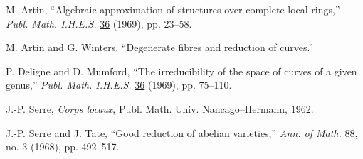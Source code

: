 \begin{enumerate}[label={[\arabic*]},leftmargin=3em]
\item M. Artin, ``Algebraic approximation of structures over complete
local rings,'' \emph{Publ. Math. I.H.E.S.} \underline{36} (1969),
pp. 23--58.

\item M. Artin and G. Winters, ``Degenerate fibres and reduction of
curves.''

\item P. Deligne and D. Mumford, ``The irreducibility of the space of
curves of a given genus,'' \emph{Publ. Math. I.H.E.S.} \underline{36}
(1969), pp. 75--110.

\item J.-P. Serre, \emph{Corps locaux}, Publ. Math. Univ.
Nancago--Hermann, 1962.

\item J.-P. Serre and J. Tate, ``Good reduction of abelian varieties,''
\emph{Ann. of Math.} \underline{88}, no. 3 (1968), pp. 492--517.
\end{enumerate}
